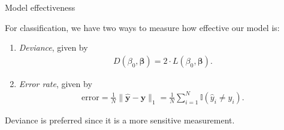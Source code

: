 \documentclass[8pt]{beamer}
\newcommand{\mys}{\vspace{0.5cm} \pause
}
\begin{document}
\begin{frame}{Model effectiveness}

For classification, we have two ways to measure how effective our model is:
\begin{enumerate}
    \item \textit{Deviance}, given by 
    \begin{align*}
        D(\beta_0, \bm{\beta}) = 2 \cdot L(\beta_0, \bm{\beta}).
    \end{align*}
    \item \textit{Error rate}, given by 
    \begin{align*}
        \mathrm{error} = \frac{1}{N} \| \hat{\mathbf{y}} - \mathbf{y}\|_1 = \frac{1}{N} \sum_{i=1}^N \mathbb{I}(\hat{y}_i \not = y_i).
    \end{align*}
\end{enumerate} \mys

Deviance is preferred since it is a more sensitive measurement.

    
\end{frame}
\end{document}
